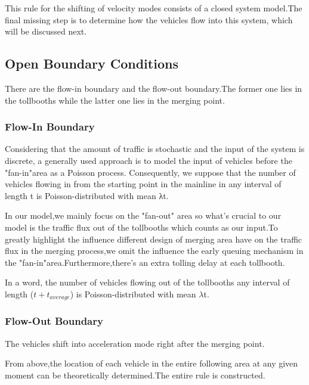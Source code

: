      This rule for the shifting of velocity modes consists of a closed system model.The final missing step is to determine how the vehicles flow into this system, which will be discussed next.

\subsection{Open Boundary Conditions}
There are the flow-in boundary and the flow-out boundary.The former one lies in the tollbooths while the latter one lies in the merging point.
\subsubsection{Flow-In Boundary}
Considering that the amount of traffic is stochastic and the input of the system is discrete, a generally used approach is to model the input of vehicles before the "fan-in"area as a Poisson process. Consequently, we suppose that the number of vehicles flowing in from the starting point in the mainline in any interval of length t is Poisson-distributed with mean λt.
   
   In our model,we mainly focus on the "fan-out" area so what's crucial to our model is the traffic flux out of the tollbooths which counts as our input.To greatly highlight the influence different design of merging area have on the traffic flux in the merging process,we omit the influence the early queuing mechanism in the "fan-in"area.Furthermore,there's an extra tolling delay at each tollbooth.

   In a word, the number of vehicles flowing out of the tollbooths any interval of length ($t+t_{average}$) is Poisson-distributed with mean $\lambda$t.
\subsubsection{Flow-Out Boundary}
The vehicles shift into acceleration mode right after the merging point.
  
    From above,the location of each vehicle in the entire following area at any given moment can be theoretically determined.The entire rule is constructed.

